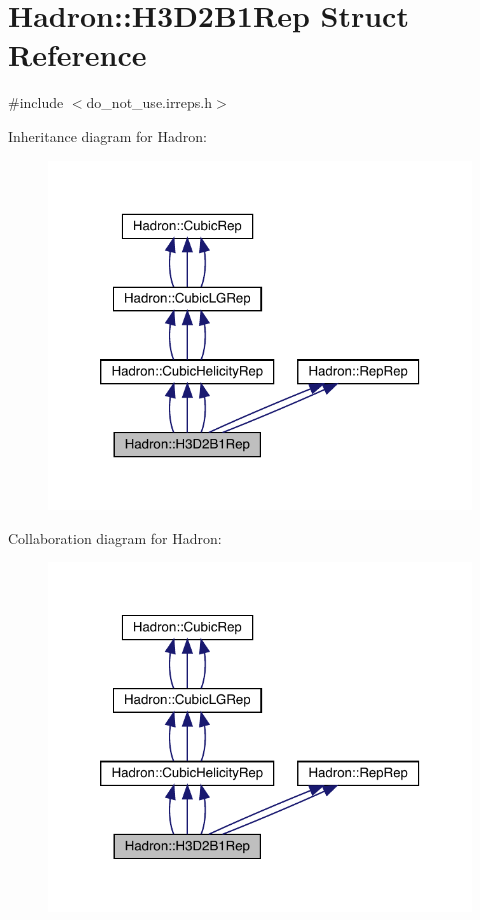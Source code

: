 \hypertarget{structHadron_1_1H3D2B1Rep}{}\section{Hadron\+:\+:H3\+D2\+B1\+Rep Struct Reference}
\label{structHadron_1_1H3D2B1Rep}


{\ttfamily \#include $<$do\+\_\+not\+\_\+use.\+irreps.\+h$>$}



Inheritance diagram for Hadron\+:
\nopagebreak
\begin{figure}[H]
\begin{center}
\leavevmode
\includegraphics[width=320pt]{de/d85/structHadron_1_1H3D2B1Rep__inherit__graph}
\end{center}
\end{figure}


Collaboration diagram for Hadron\+:
\nopagebreak
\begin{figure}[H]
\begin{center}
\leavevmode
\includegraphics[width=320pt]{de/d2b/structHadron_1_1H3D2B1Rep__coll__graph}
\end{center}
\end{figure}

